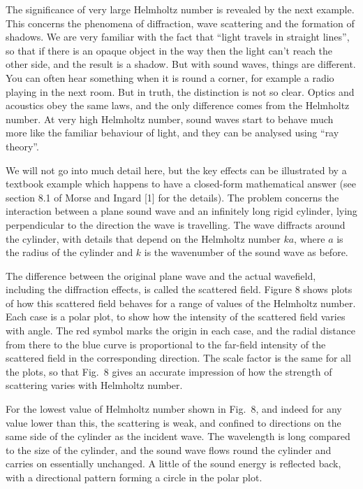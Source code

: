   The significance of very large Helmholtz number is revealed by the next 
  example. This concerns the phenomena of diffraction, wave scattering and the 
  formation of shadows. We are very familiar with the fact that ``light travels 
  in straight lines'', so that if there is an opaque object in the way then the 
  light can't reach the other side, and the result is a shadow. But with sound 
  waves, things are different. You can often hear something when it is round a 
  corner, for example a radio playing in the next room. But in truth, the 
  distinction is not so clear. Optics and acoustics obey the same laws, and the 
  only difference comes from the Helmholtz number. At very high Helmholtz 
  number, sound waves start to behave much more like the familiar behaviour of 
  light, and they can be analysed using ``ray theory''. 

  We will not go into much detail here, but the key effects can be illustrated 
  by a textbook example which happens to have a closed-form mathematical answer 
  (see section 8.1 of Morse and Ingard [1] for the details). The problem 
  concerns the interaction between a plane sound wave and an infinitely long 
  rigid cylinder, lying perpendicular to the direction the wave is travelling. 
  The wave diffracts around the cylinder, with details that depend on the 
  Helmholtz number $ka$, where $a$ is the radius of the cylinder and $k$ is the 
  wavenumber of the sound wave as before. 

  The difference between the original plane wave and the actual wavefield, 
  including the diffraction effects, is called the scattered field. Figure 8 
  shows plots of how this scattered field behaves for a range of values of the 
  Helmholtz number. Each case is a polar plot, to show how the intensity of the 
  scattered field varies with angle. The red symbol marks the origin in each 
  case, and the radial distance from there to the blue curve is proportional to 
  the far-field intensity of the scattered field in the corresponding 
  direction. The scale factor is the same for all the plots, so that Fig.\ 8 
  gives an accurate impression of how the strength of scattering varies with 
  Helmholtz number. 

  For the lowest value of Helmholtz number shown in Fig.\ 8, and indeed for any 
  value lower than this, the scattering is weak, and confined to directions on 
  the same side of the cylinder as the incident wave. The wavelength is long 
  compared to the size of the cylinder, and the sound wave flows round the 
  cylinder and carries on essentially unchanged. A little of the sound energy 
  is reflected back, with a directional pattern forming a circle in the polar 
  plot. 

